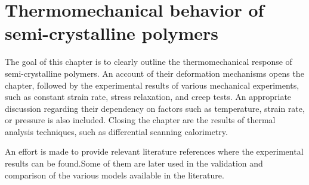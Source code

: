 \chapter{Thermomechanical behavior of semi-crystalline polymers} \label{ch:thermomechanical_behavior_semi_crystalline_polymer}






The goal of this chapter is to clearly outline the thermomechanical response of semi-crystalline polymers.
An account of their deformation mechanisms opens the chapter, followed by the experimental results of various mechanical experiments, such as constant strain rate, stress relaxation, and creep tests.
An appropriate discussion regarding their dependency on factors such as temperature, strain rate, or pressure is also included.
Closing the chapter are the results of thermal analysis techniques, such as differential scanning calorimetry.

An effort is made to provide relevant literature references where the experimental results can be found.Some of them are later used in the validation and comparison of the various models available in the literature.

